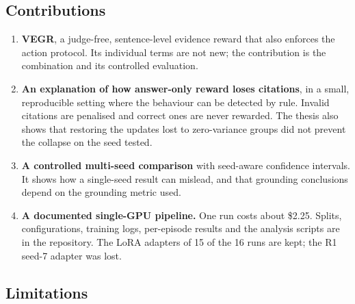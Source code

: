 \subsection{Contributions}\label{sec:5.2}

\begin{enumerate}
\def\labelenumi{\arabic{enumi}.}
\tightlist
\item
  \textbf{VEGR}, a judge-free, sentence-level evidence reward that also
  enforces the action protocol. Its individual terms are not new; the
  contribution is the combination and its controlled evaluation.
\item
  \textbf{An explanation of how answer-only reward loses citations}, in
  a small, reproducible setting where the behaviour can be detected by
  rule. Invalid citations are penalised and correct ones are never
  rewarded. The thesis also shows that restoring the updates lost to
  zero-variance groups did not prevent the collapse on the seed tested.
\item
  \textbf{A controlled multi-seed comparison} with seed-aware confidence
  intervals. It shows how a single-seed result can mislead, and that
  grounding conclusions depend on the grounding metric used.
\item
  \textbf{A documented single-GPU pipeline.} One run costs about \$2.25.
  Splits, configurations, training logs, per-episode results and the
  analysis scripts are in the repository. The LoRA adapters of 15 of the
  16 runs are kept; the R1 seed-7 adapter was lost.
\end{enumerate}

\subsection{Limitations}\label{sec:5.3}

